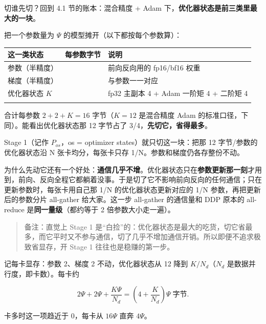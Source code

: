\documentclass[
  chinese,
]{ctexart}
\begin{document}
切谁先切？回到 4.1 节的账本：混合精度 + Adam
下，\textbf{优化器状态是前三类里最大的一块}。

把一个参数量为 \(\Psi\) 的模型摊开（以下都按每个参数算）：

\begin{center}
\begin{tabular}{@{}>{\raggedright\arraybackslash}p{} >{\raggedright\arraybackslash}p{} >{\raggedright\arraybackslash}p{}@{}}
\toprule\noalign{}
这一类状态 & 每参数字节 & 说明 \\
\midrule\noalign{}
参数（半精度） & 2 & 前向反向用的 fp16/bf16 权重 \\
梯度（半精度） & 2 & 与参数一一对应 \\
优化器状态 \(K\) & 12 & fp32 主副本 4 + Adam 一阶矩 4 + 二阶矩 4 \\
\bottomrule\noalign{}
\end{tabular}
\end{center}

合计每参数 \(2+2+K = 16\) 字节（\(K=12\) 是混合精度 Adam
的标准口径，下同）。能看出优化器状态那 12 字节占了
3/4，\textbf{先切它，省得最多}。

Stage 1（记作 \(P_{os}\)，os = optimizer states）就只切这一块：把那 12
字节/参数的优化器状态沿 N 张卡均分，每张卡只存
1/N。参数和梯度仍各存整份不动。

为什么先动它还有一个好处：\textbf{通信几乎不增}。优化器状态只在\textbf{参数更新那一刻}才用到，前向、反向全程它都躺着没事。于是切了它不影响前向反向的任何通信；只在更新参数时，每张卡用自己那
1/N 的优化器状态更新对应的 1/N 参数，再把更新后的参数分片 all-gather
给大家。这一步 all-gather 的通信量和 DDP 原本的 all-reduce
是\textbf{同一量级}（都约等于 2 倍参数大小走一遍）。

\begin{quote}
备注：直觉上 Stage 1
是``白捡''的：优化器状态是最大的吃货，切它省最多，而它平时又不参与通信，切了几乎不增加通信开销。所以即便不追求极致省显存，开
Stage 1 往往也是稳赚的第一步。
\end{quote}

记每卡显存：参数 2、梯度 2 不动，优化器状态从 12 降到 \(K/N_d\)（\(N_d\)
是数据并行度，即卡数）。每卡约

\[
2\Psi + 2\Psi + \frac{K\Psi}{N_d} = \left(4 + \frac{K}{N_d}\right)\Psi \;\text{字节}.
\]

卡多时这一项趋近于 0，每卡从 \(16\Psi\) 直奔 \(4\Psi\)。
\end{document}
